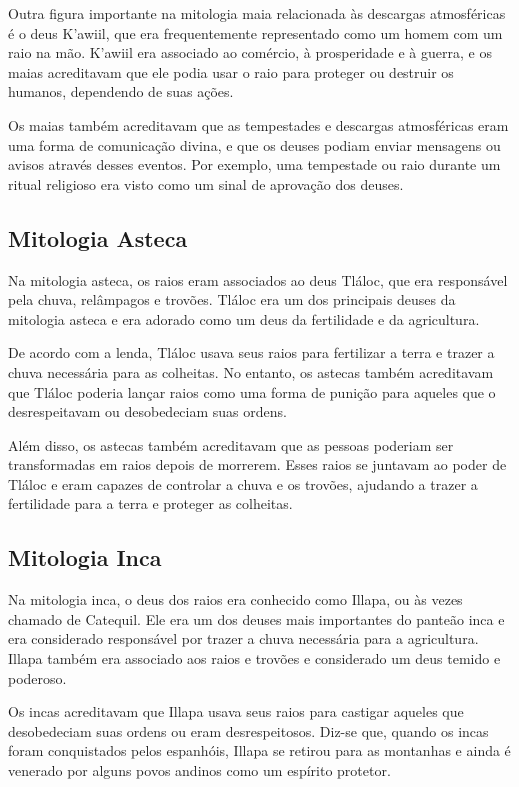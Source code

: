 \documentclass[a4paper, 12pt, onecolumn,singlespacing]{article}
\begin{document}
	Outra figura importante na mitologia maia relacionada às descargas atmosféricas é o deus K'awiil, que era frequentemente representado como um homem com um raio na mão. K'awiil era associado ao comércio, à prosperidade e à guerra, e os maias acreditavam que ele podia usar o raio para proteger ou destruir os humanos, dependendo de suas ações.
	
	Os maias também acreditavam que as tempestades e descargas atmosféricas eram uma forma de comunicação divina, e que os deuses podiam enviar mensagens ou avisos através desses eventos. Por exemplo, uma tempestade ou raio durante um ritual religioso era visto como um sinal de aprovação dos deuses.
	
	\subsection{Mitologia Asteca}
	
	Na mitologia asteca, os raios eram associados ao deus Tláloc, que era responsável pela chuva, relâmpagos e trovões. Tláloc era um dos principais deuses da mitologia asteca e era adorado como um deus da fertilidade e da agricultura.
	
	De acordo com a lenda, Tláloc usava seus raios para fertilizar a terra e trazer a chuva necessária para as colheitas. No entanto, os astecas também acreditavam que Tláloc poderia lançar raios como uma forma de punição para aqueles que o desrespeitavam ou desobedeciam suas ordens.
	
	Além disso, os astecas também acreditavam que as pessoas poderiam ser transformadas em raios depois de morrerem. Esses raios se juntavam ao poder de Tláloc e eram capazes de controlar a chuva e os trovões, ajudando a trazer a fertilidade para a terra e proteger as colheitas.
	
	\subsection{Mitologia Inca}
	
	Na mitologia inca, o deus dos raios era conhecido como Illapa, ou às vezes chamado de Catequil. Ele era um dos deuses mais importantes do panteão inca e era considerado responsável por trazer a chuva necessária para a agricultura. Illapa também era associado aos raios e trovões e considerado um deus temido e poderoso.
	
	Os incas acreditavam que Illapa usava seus raios para castigar aqueles que desobedeciam suas ordens ou eram desrespeitosos. Diz-se que, quando os incas foram conquistados pelos espanhóis, Illapa se retirou para as montanhas e ainda é venerado por alguns povos andinos como um espírito protetor.
	
\end{document}

